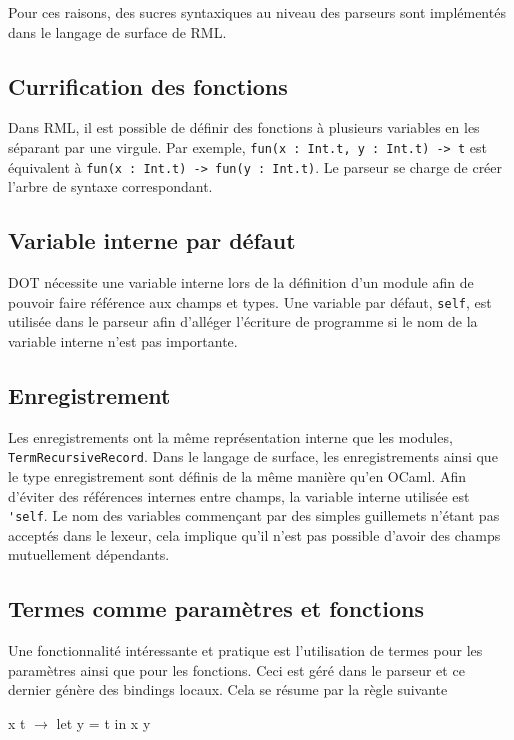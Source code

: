 Pour ces raisons, des sucres syntaxiques au niveau des parseurs sont implémentés
dans le langage de surface de RML.

\subsection*{Currification des fonctions}

Dans RML, il est possible de définir des fonctions à plusieurs variables en les
séparant par une virgule.
Par exemple, \verb|fun(x : Int.t, y : Int.t) -> t| est équivalent à
\verb|fun(x : Int.t) -> fun(y : Int.t)|. Le parseur se charge de créer l'arbre de
syntaxe correspondant.

\subsection*{Variable interne par défaut}

DOT nécessite une variable interne lors de la définition d'un module afin de
pouvoir faire référence aux champs et types. Une variable par défaut,
\verb|self|, est utilisée dans le parseur afin d'alléger l'écriture de programme
si le nom de la variable interne n'est pas importante.

\subsection*{Enregistrement}

Les enregistrements ont la même représentation interne que les modules,
\verb|TermRecursiveRecord|. Dans le langage de surface, les enregistrements
ainsi que le type enregistrement sont définis de la même manière qu'en OCaml.
Afin d'éviter des références internes entre champs, la variable interne utilisée
est \verb|'self|. Le nom des variables commençant par des simples guillemets
n'étant pas acceptés dans le lexeur, cela implique qu'il n'est pas possible
d'avoir des champs mutuellement dépendants.

\subsection*{Termes comme paramètres et fonctions}

Une fonctionnalité intéressante et pratique est l'utilisation de
termes pour les paramètres ainsi que pour les fonctions. Ceci
est géré dans le parseur et ce dernier génère des bindings locaux. Cela se
résume par la règle suivante

\begin{center}
  x t $\rightarrow$ let y = t in x y
\end{center}

